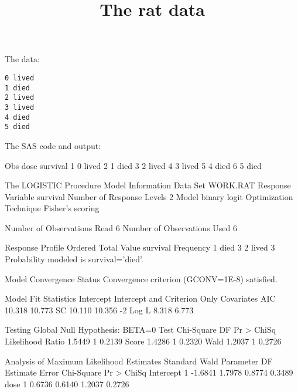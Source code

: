 \documentclass{article}
\title{The rat data}
\begin{document}
\maketitle
The data:
\begin{verbatim}
0 lived
1 died
2 lived
3 lived
4 died
5 died
\end{verbatim}
The SAS code and output:
\begin{Woutput}
Obs    dose    survival
 1       0      lived
 2       1      died
 3       2      lived
 4       3      lived
 5       4      died
 6       5      died

The LOGISTIC Procedure
              Model Information
Data Set                      WORK.RAT
Response Variable             survival
Number of Response Levels     2
Model                         binary logit
Optimization Technique        Fisher's scoring

Number of Observations Read           6
Number of Observations Used           6

          Response Profile
 Ordered                      Total
   Value     survival     Frequency
       1     died                 3
       2     lived                3
Probability modeled is survival='died'.

                    Model Convergence Status
         Convergence criterion (GCONV=1E-8) satisfied.

         Model Fit Statistics
                             Intercept
              Intercept            and
Criterion          Only     Covariates
AIC              10.318         10.773
SC               10.110         10.356
-2 Log L          8.318          6.773

        Testing Global Null Hypothesis: BETA=0
Test                 Chi-Square       DF     Pr > ChiSq
Likelihood Ratio         1.5449        1         0.2139
Score                    1.4286        1         0.2320
Wald                     1.2037        1         0.2726

             Analysis of Maximum Likelihood Estimates
                               Standard          Wald
Parameter    DF    Estimate       Error    Chi-Square    Pr > ChiSq
Intercept     1     -1.6841      1.7978        0.8774        0.3489
dose          1      0.6736      0.6140        1.2037        0.2726


\end{Woutput}
\end{document}
